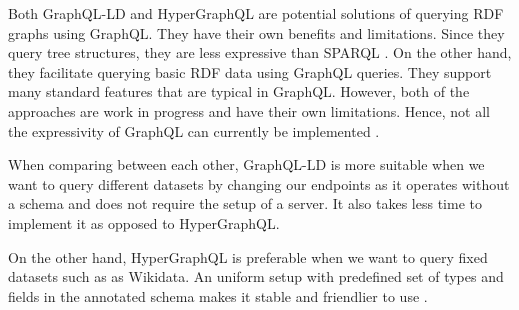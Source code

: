 Both GraphQL-LD and HyperGraphQL are potential solutions of querying RDF graphs using GraphQL. They have their own benefits and limitations. Since they query tree structures, they are less expressive than SPARQL \cite{Werbrouck2019}. On the other hand, they facilitate querying basic RDF data using GraphQL queries. They support many standard features that are typical in GraphQL. However, both of the approaches are work in progress and have their own limitations. Hence, not all the expressivity of GraphQL can currently be implemented \cite{Werbrouck2019}.

When comparing between each other, GraphQL-LD is more suitable when we want to query different datasets by changing our endpoints as it operates without a schema and does not require the setup of a server. It also takes less time to implement it as opposed to HyperGraphQL.

On the other hand, HyperGraphQL is preferable when we want to query fixed datasets such as as Wikidata. An uniform setup with predefined set of types and fields in the annotated schema makes it stable and friendlier to use \cite{Werbrouck2019a}. 
